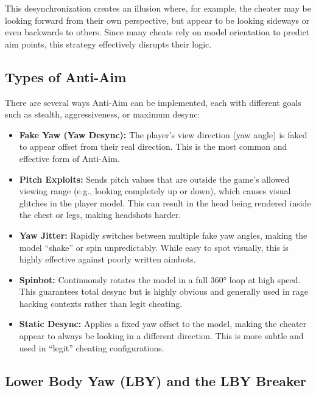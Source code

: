 This desynchronization creates an illusion where, for example, the cheater may be looking forward from their own perspective, but appear to be looking sideways or even backwards to others. Since many cheats rely on model orientation to predict aim points, this strategy effectively disrupts their logic.

\subsection{Types of Anti-Aim}

There are several ways Anti-Aim can be implemented, each with different goals such as stealth, aggressiveness, or maximum desync:

\begin{itemize}
    \item \textbf{Fake Yaw (Yaw Desync):} The player's view direction (yaw angle) is faked to appear offset from their real direction. This is the most common and effective form of Anti-Aim.
    
    \item \textbf{Pitch Exploits:} Sends pitch values that are outside the game's allowed viewing range (e.g., looking completely up or down), which causes visual glitches in the player model. This can result in the head being rendered inside the chest or legs, making headshots harder.
    
    \item \textbf{Yaw Jitter:} Rapidly switches between multiple fake yaw angles, making the model “shake” or spin unpredictably. While easy to spot visually, this is highly effective against poorly written aimbots.
    
    \item \textbf{Spinbot:} Continuously rotates the model in a full 360° loop at high speed. This guarantees total desync but is highly obvious and generally used in rage hacking contexts rather than legit cheating.
    
    \item \textbf{Static Desync:} Applies a fixed yaw offset to the model, making the cheater appear to always be looking in a different direction. This is more subtle and used in “legit” cheating configurations.
\end{itemize}

\subsection{Lower Body Yaw (LBY) and the LBY Breaker}

